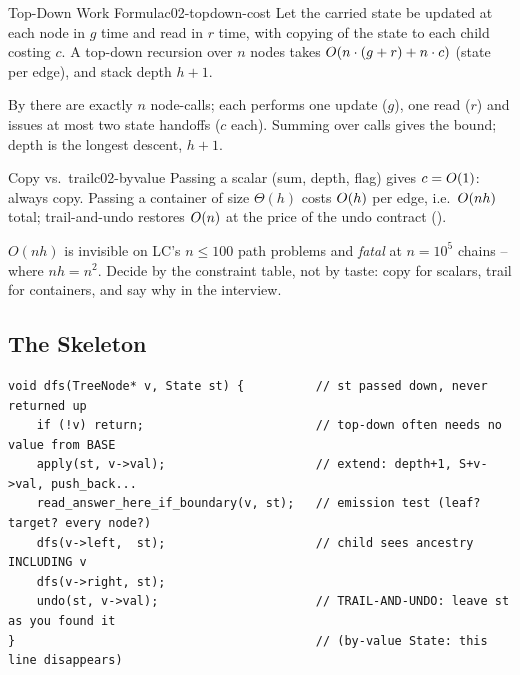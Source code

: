 \begin{theorem}{Top-Down Work Formula}{c02-topdown-cost}
Let the carried state be updated at each node in $g$ time and read in $r$ time,
with copying of the state to each child costing $c$. A top-down recursion over
$n$ nodes takes $O(n \cdot (g + r) + n \cdot c)$ (state per edge), and stack
depth $h+1$.
\end{theorem}
\begin{proofbox}
By  there are exactly $n$ node-calls; each performs one
update ($g$), one read ($r$) and issues at most two state handoffs ($c$ each).
Summing over calls gives the bound; depth is the longest descent, $h+1$.
\end{proofbox}
\begin{corollary}{Copy vs.\ trail}{c02-byvalue}
Passing a scalar (sum, depth, flag) gives $c=O(1)$: always copy. Passing a
container of size $\Theta(h)$ costs $O(h)$ per edge, i.e.\ $O(nh)$ total;
trail-and-undo restores $O(n)$ at the price of the undo contract
().
\end{corollary}

\begin{insightbox}
$O(nh)$ is invisible on LC's $n \le 100$ path problems and \emph{fatal} at
$n = 10^{5}$ chains -- where $nh = n^{2}$. Decide by the constraint table, not by
taste: copy for scalars, trail for containers, and say why in the interview.
\end{insightbox}

\subsection{The Skeleton}

\begin{lstlisting}[caption={The top-down skeleton: SLOT 2 filled. Parents hand each child a finished fact about its own ancestry.}, label={lst:c02-td-skeleton}]
void dfs(TreeNode* v, State st) {          // st passed down, never returned up
    if (!v) return;                        // top-down often needs no value from BASE
    apply(st, v->val);                     // extend: depth+1, S+v->val, push_back...
    read_answer_here_if_boundary(v, st);   // emission test (leaf? target? every node?)
    dfs(v->left,  st);                     // child sees ancestry INCLUDING v
    dfs(v->right, st);
    undo(st, v->val);                      // TRAIL-AND-UNDO: leave st as you found it
}                                          // (by-value State: this line disappears)
\end{lstlisting}

